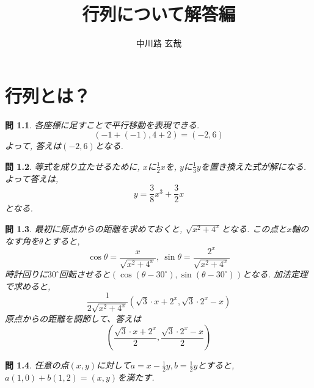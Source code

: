 \documentclass[a4paper,12pt]{jreport}
\title{行列について解答編}
\author{中川路 玄哉}
\newtheorem{problem}{問}[chapter]
\theoremstyle{definition}
\newcommand{\ang}[1]{#1^\circ}
\begin{document}
\chapter{行列とは？}
\begin{problem}
  各座標に足すことで平行移動を表現できる.
  $$
  (-1+(-1),4+2)=(-2,6)
  $$
  よって, 答えは$(-2,6)$となる.
\end{problem}
\begin{problem}
  等式を成り立たせるために, $x$に$\frac{1}{2}x$を, $y$に$\frac{1}{3}y$を置き換えた式が解になる.
  よって答えは, 
  $$y=\frac{3}{8}x^3+\frac{3}{2}x$$
  となる.
\end{problem}
\begin{problem}
  最初に原点からの距離を求めておくと, $\sqrt{x^2+4^{x}}$となる.
  この点と$x$軸のなす角を$\theta$とすると, 
  $$
  \cos\theta=\frac{x}{\sqrt{x^2+4^{x}}},\ \sin\theta=\frac{2^x}{\sqrt{x^2+4^{x}}}
  $$
  時計回りに$\ang{30}$回転させると$(\cos(\theta - \ang{30}), \sin(\theta - \ang{30}))$となる.
  加法定理で求めると, 
  $$
  \frac{1}{2\sqrt{x^2+4^{x}}}(\sqrt{3}\cdot x+2^x, \sqrt{3}\cdot 2^x-x)
  $$
  原点からの距離を調節して、答えは
  $$
  \left(\frac{\sqrt{3}\cdot x+2^x}{2}, \frac{\sqrt{3}\cdot 2^x-x}{2}\right)
  $$
\end{problem}
\begin{problem}
  任意の点$(x,y)$に対して$a=x-\frac{1}{2}y,b=\frac{1}{2}y$とすると, $a(1,0)+b(1,2)=(x,y)$を満たす.
\end{problem}
\end{document}
